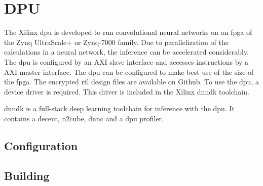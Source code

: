 \section{DPU}
\label{sec:embedded_platform:dpu}
The Xilinx \acrfull{dpu} is developed to run convolutional neural networks on an \acrshort{fpga} of the Zynq UltraScale+ or Zynq-7000 family.
Due to parallelization of the calculations in a neural network, the inference can be accelerated considerably.
The \acrshort{dpu} is configured by an AXI slave interface and accesses instructions by a AXI master interface.
The \acrshort{dpu} can be configured to make best use of the size of the \acrshort{fpga}.
The encrypted \acrshort{rtl} design files are available on Github.
To use the \acrshort{dpu}, a device driver is required.
This driver is included in the Xilinx \acrfull{dnndk} toolchain.

\acrshort{dnndk} is a full-stack deep learning toolchain for inference with the \acrshort{dpu}.
It contains a \acrfull{decent}, \acrfull{n2cube}, \acrfull{dnnc} and a \acrshort{dpu} profiler.

\subsection{Configuration}
\label{subsec:embedded_platform:dpu:configuration}

\subsection{Building}
\label{subsec:embedded_platform:dpu:building}

